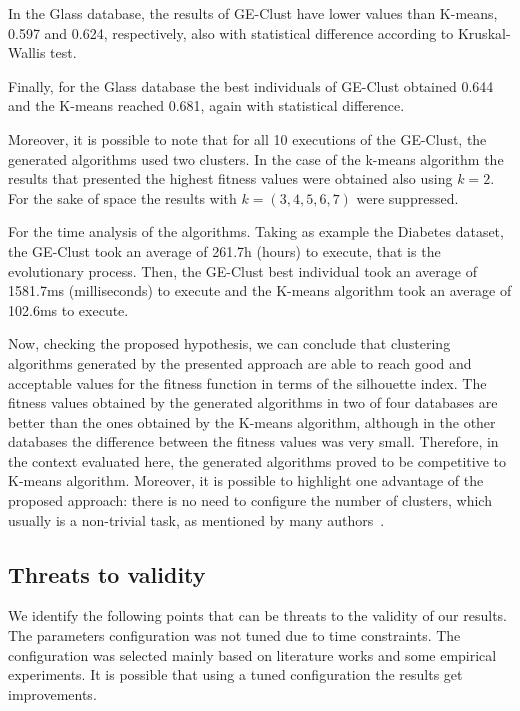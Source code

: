\documentclass[conference]{IEEEtran}
\begin{document}
	
	In the Glass database, the results of GE-Clust have lower values than K-means, 0.597 and 0.624, respectively, also with statistical difference according to Kruskal- Wallis test. 
	
	
	Finally, for the Glass database the best individuals of GE-Clust obtained 0.644 and the K-means reached 0.681, again with statistical difference.
	
	
	Moreover, it is possible to note that for all 10 executions of the GE-Clust, the generated algorithms used two clusters. In the case of the k-means algorithm the results that presented the highest fitness values were obtained also using $k=2$. For the sake of space the results with $k = (3,4,5,6,7)$ were suppressed.
	
	
	
	For the time analysis of the algorithms. Taking as example the Diabetes dataset, the GE-Clust took an average of 261.7h (hours) to execute, that is the evolutionary process. Then, the GE-Clust best individual took an average of 1581.7ms (milliseconds) to execute and the K-means algorithm took an average of 102.6ms to execute.
	
	
	Now, checking the proposed hypothesis, we can conclude that clustering algorithms generated by the presented approach are able to reach good and acceptable values for the fitness function in terms of the silhouette index. The fitness values obtained by the generated algorithms in two of four databases are better than the ones obtained by the K-means algorithm, although in the other databases the difference between the fitness values was very small. Therefore, in the context evaluated here, the generated algorithms proved to be competitive to K-means algorithm. Moreover, it is possible to highlight one advantage of the proposed approach: there is no need to configure the number of clusters, which usually is a non-trivial task, as mentioned by many authors~\cite{tibshirani2001estimating}.
	
	
	\subsection{Threats to validity}
	
	
	We identify the following points that can be threats to the validity of our results. The parameters configuration was not tuned due to time constraints. The configuration was selected mainly based on literature works and some empirical experiments. It is possible that using a tuned configuration the results get improvements.
	
\end{document}
